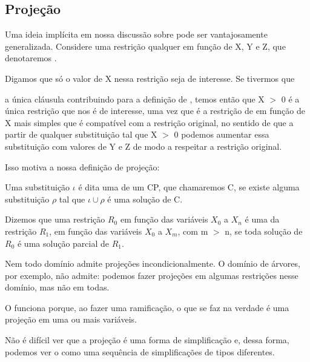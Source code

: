 \documentclass{article}
\begin{document}
\subsection{Projeção}

Uma ideia implícita em nossa discussão sobre  pode ser vantajosamente generalizada. Considere uma restrição qualquer em função de X, Y e Z, que denotaremos .

Digamos que só o valor de X nessa restrição seja de interesse. Se tivermos que


 a única cláusula contribuindo para a definição de , temos então que X $>$ 0
é a única restrição que nos é de interesse, uma vez que é a restrição de em função de X mais simples que é compatível com a restrição original, no sentido de que a partir de qualquer substituição tal que X $>$ 0 podemos aumentar essa substituição com valores de Y e Z de modo a respeitar a restrição original.

Isso motiva a nossa definição de projeção:

\begin{definition}
  Uma substituição $\iota$ é dita uma  de um CP, que chamaremos C, se existe alguma substituição $\rho$ tal que $\iota \cup \rho$ é uma solução de C.
\end{definition}

\begin{definition}
  Dizemos que uma restrição $R_0$ em função das variáveis $X_0$ a $X_n$ é uma  da restrição $R_1$, em função das variáveis $X_0$ a $X_m$, com m $>$ n, se toda solução de $R_0$ é uma solução parcial de $R_1$.
\end{definition}

Nem todo domínio admite projeções incondicionalmente. O domínio de árvores, por exemplo, não admite: podemos fazer projeções em algumas restrições nesse domínio, mas não em todas.

O  funciona porque, ao fazer uma ramificação, o que se faz na verdade é uma projeção em uma ou mais variáveis.

Não é difícil ver que a projeção é uma forma de simplificação e, dessa forma, podemos ver o  como uma sequência de simplificações de tipos diferentes.
\end{document}

